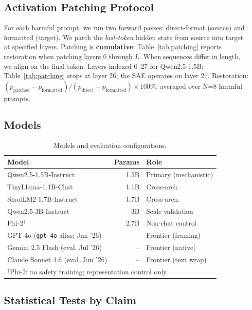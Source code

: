 \documentclass[conference]{IEEEtran}
\begin{document}
\subsection{Activation Patching Protocol}
\label{sec:patch_method}

For each harmful prompt, we run two forward passes: direct-format (source) and formatted (target). We patch the \emph{last-token} hidden state from source into target at specified layers. Patching is \textbf{cumulative}: Table~\ref{tab:patching} reports restoration when patching layers 0 through $L$. When sequences differ in length, we align on the final token. Layers indexed 0--27 for Qwen2.5-1.5B; Table~\ref{tab:patching} stops at layer 26; the SAE operates on layer 27. Restoration: $(p_{\text{patched}} - p_{\text{formatted}}) / (p_{\text{direct}} - p_{\text{formatted}}) \times 100\%$, averaged over N=8 harmful prompts.

\subsection{Models}

\begin{table}[t]
\caption{Models and evaluation configurations.}
\label{tab:models}
\centering
\footnotesize
\begin{tabular}{lrl}
\toprule
Model & Params & Role \\
\midrule
Qwen2.5-1.5B-Instruct & 1.5B & Primary (mechanistic) \\
TinyLlama-1.1B-Chat & 1.1B & Cross-arch. \\
SmolLM2-1.7B-Instruct & 1.7B & Cross-arch. \\
Qwen2.5-3B-Instruct & 3B & Scale validation \\
Phi-2$^\dagger$ & 2.7B & Non-chat control \\
\midrule
GPT-4o (\texttt{gpt-4o} alias; Jun '26) & -- & Frontier (framing) \\
Gemini 2.5 Flash (eval. Jul '26) & -- & Frontier (native) \\
Claude Sonnet 4.6 (eval. Jun '26) & -- & Frontier (text wrap) \\
\bottomrule
\multicolumn{3}{l}{\scriptsize $^\dagger$Phi-2: no safety training; representation control only.}
\end{tabular}
\end{table}

\subsection{Statistical Tests by Claim}
\end{document}
